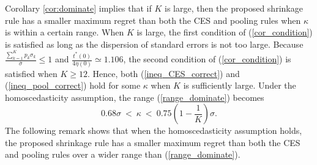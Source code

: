 \documentclass[12pt,a4paper]{article}
\begin{document}
Corollary \ref{cor:dominate} implies that if $K$ is large, then the proposed shrinkage rule has a smaller maximum regret than both the CES and pooling rules when $\kappa$ is within a certain range. When $K$ is large, the first condition of (\ref{cor_condition}) is satisfied as long as the dispersion of standard errors is not too large. Because $\frac{\sum_{k=1}^K p_k \sigma_k}{\overline{\sigma}} \leq 1$ and $\frac{t^{\ast}(0) }{4 \eta(0)} \simeq 1.106$, the second condition of (\ref{cor_condition}) is satisfied when $K \geq 12$. Hence, both (\ref{ineq_CES_correct}) and (\ref{ineq_pool_correct}) hold for some $\kappa$ when $K$ is sufficiently large. Under the homoscedasticity assumption, the range (\ref{range_dominate}) becomes
\[
0.68 \sigma \ < \ \kappa \ < \ 0.75 \left( 1 - \frac{1}{K} \right) \sigma.
\]
The following remark shows that when the homoscedasticity assumption holds, the proposed shrinkage rule has a smaller maximum regret than both the CES and pooling rules over a wider range than (\ref{range_dominate}).
\end{document}
